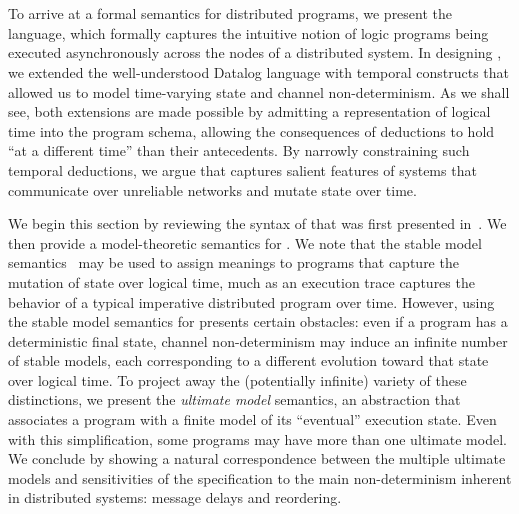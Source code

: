 \section{\large \bf \lang}
\label{sec:foundation}

To arrive at a formal semantics for distributed programs, we present the
\lang~\cite{dedalus} language, which formally captures the intuitive notion of
logic programs being executed asynchronously across the nodes of a distributed
system.  In designing \lang, we extended the well-understood Datalog language
with temporal constructs that allowed us to model time-varying state and channel
non-determinism.  As we shall see, both extensions are made possible by
admitting a representation of logical time into the program schema, allowing the
consequences of deductions to hold ``at a different time'' than their
antecedents.  By narrowly constraining such temporal deductions, we argue that
\lang captures salient features of systems that communicate over unreliable
networks and mutate state over time.

We begin this section by reviewing the syntax of \lang that was first presented
in~\cite{dedalus}. We then provide a model-theoretic semantics for \lang.  We
note that the stable model semantics~\cite{stable-model} may be used to assign
meanings to \lang programs that capture the mutation of state over logical time,
much as an execution trace 
captures the behavior of a typical imperative distributed program over time.
However, using the stable model semantics for \lang presents certain obstacles:
even if a \lang program has a deterministic final state, channel non-determinism
may induce an infinite number of stable models, each corresponding to a
different evolution toward that state over logical time.  To project away the
(potentially infinite) variety of these distinctions, we present the {\em
  ultimate model} semantics, an abstraction that associates a program with a
finite model of its ``eventual'' execution state.  Even with this
simplification, some programs may have more than one ultimate model.  We
conclude by showing a natural correspondence between the multiple ultimate
models and sensitivities of the specification to the main non-determinism
inherent in distributed systems: message delays and reordering.


